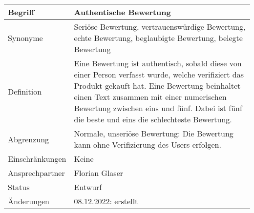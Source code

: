 \begin{table}[H]
    \centering
    \label{gls:authentischeBewertung}
    \begin{tabularx}{\textwidth}{| l | X |}
        \hline
        Begriff         & Authentische Bewertung                                                                                                                                                                                                                                                                        \\
        \hline
        Synonyme        & Seriöse Bewertung, vertrauenswürdige Bewertung, echte Bewertung, beglaubigte Bewertung, belegte Bewertung                                                                                                                                                                                     \\
        \hline
        Definition      & Eine Bewertung ist authentisch, sobald diese von einer Person verfasst wurde, welche verifiziert das Produkt gekauft hat. Eine Bewertung beinhaltet einen Text zusammen mit einer numerischen Bewertung zwischen eins und fünf. Dabei ist fünf die beste und eins die schlechteste Bewertung. \\
        \hline
        Abgrenzung      & Normale, unseriöse Bewertung: Die Bewertung kann ohne Verifizierung des Users erfolgen.                                                                                                                                                                                                       \\
        \hline
        Einschränkungen & Keine                                                                                                                                                                                                                                                                                         \\
        \hline
        Ansprechpartner & Florian Glaser                                                                                                                                                                                                                                                                                \\
        \hline
        Status          & Entwurf                                                                                                                                                                                                                                                                                       \\
        \hline
        Änderungen      & 08.12.2022: erstellt                                                                                                                                                                                                                                                                          \\
        \hline
    \end{tabularx}
\end{table}

